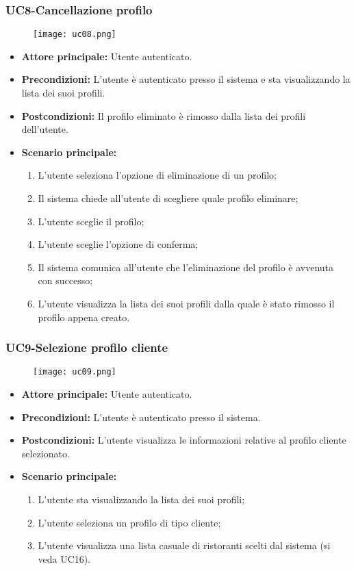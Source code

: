 \pagebreak
\subsubsection{UC8-Cancellazione profilo}
\begin{figure}[h] \texttt{[image: uc08.png]} \end{figure}
\begin{itemize}
\item \textbf{Attore principale:} Utente autenticato.
\item \textbf{Precondizioni:} L'utente è autenticato presso il sistema e sta visualizzando la lista dei suoi profili.
\item \textbf{Postcondizioni:} Il profilo eliminato è rimosso dalla lista dei profili dell'utente.
\item \textbf{Scenario principale:}
\begin{enumerate}
    \item L'utente seleziona l'opzione di eliminazione di un profilo;
    \item Il sistema chiede all'utente di scegliere quale profilo eliminare;
    \item L'utente sceglie il profilo;
    \item L'utente sceglie l'opzione di conferma;
    \item Il sistema comunica all'utente che l'eliminazione del profilo è avvenuta con successo;
    \item L'utente visualizza la lista dei suoi profili dalla quale è stato rimosso il profilo appena creato.
\end{enumerate}
\end{itemize}

\subsubsection{UC9-Selezione profilo cliente} %
\begin{figure}[h] \texttt{[image: uc09.png]} \end{figure} 
\begin{itemize}
\item \textbf{Attore principale:} Utente autenticato.
\item \textbf{Precondizioni:} L'utente è autenticato presso il sistema.
\item \textbf{Postcondizioni:} L'utente visualizza le informazioni relative al profilo cliente selezionato.
\item \textbf{Scenario principale:}
\begin{enumerate}
    \item L'utente sta visualizzando la lista dei suoi profili;
    \item L'utente seleziona un profilo di tipo cliente;
    \item L'utente visualizza una lista casuale di ristoranti scelti dal sistema (si veda UC16).
\end{enumerate}
\end{itemize}

